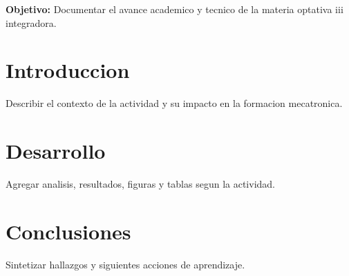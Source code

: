 \documentclass[spanish,letterpaper,oneside]{article}
\begin{document}
\templatePortrait
\templatePagecfg
\onehalfspacing

\begin{abstractd}
\textbf{Objetivo:} Documentar el avance academico y tecnico de la materia optativa iii integradora.
\end{abstractd}

\templateIndex
\templateFinalcfg

\section{Introduccion}
Describir el contexto de la actividad y su impacto en la formacion mecatronica.

\section{Desarrollo}
Agregar analisis, resultados, figuras y tablas segun la actividad.

\section{Conclusiones}
Sintetizar hallazgos y siguientes acciones de aprendizaje.



\end{document}
